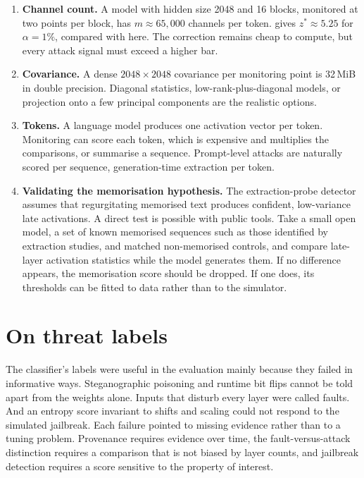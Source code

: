 \begin{enumerate}[leftmargin=*]
  \item \textbf{Channel count.} A model with hidden size 2048 and 16 blocks, monitored at two
        points per block, has $m\approx 65{,}000$ channels per token.  gives
        $z^*\approx 5.25$ for $\alpha=1\%$, compared with \ZBonf{} here. The correction remains
        cheap to compute, but every attack signal must exceed a higher bar.
  \item \textbf{Covariance.} A dense $2048\times2048$ covariance per monitoring point is 32\,MiB
        in double precision. Diagonal statistics, low-rank-plus-diagonal models, or projection
        onto a few principal components are the realistic options.
  \item \textbf{Tokens.} A language model produces one activation vector per token. Monitoring
        can score each token, which is expensive and multiplies the comparisons, or summarise a
        sequence. Prompt-level attacks are naturally scored per sequence, generation-time
        extraction per token.
  \item \textbf{Validating the memorisation hypothesis.} The extraction-probe detector assumes
        that regurgitating memorised text produces confident, low-variance late activations. A
        direct test is possible with public tools. Take a small open model, a set of known
        memorised sequences such as those identified by extraction studies, and matched
        non-memorised controls, and compare late-layer activation statistics while the model
        generates them. If no difference appears, the memorisation score should be dropped. If
        one does, its thresholds can be fitted to data rather than to the simulator.
\end{enumerate}

\section{On threat labels}
\label{sec:disc:labels}

The classifier's labels were useful in the evaluation mainly because they failed in informative
ways. Steganographic poisoning and runtime bit flips cannot be told apart from the weights alone.
Inputs that disturb every layer were called faults. And an entropy score invariant to shifts and
scaling could not respond to the simulated jailbreak. Each failure pointed to missing evidence
rather than to a tuning problem. Provenance requires evidence over time, the fault-versus-attack
distinction requires a comparison that is not biased by layer counts, and jailbreak detection
requires a score sensitive to the property of interest.

